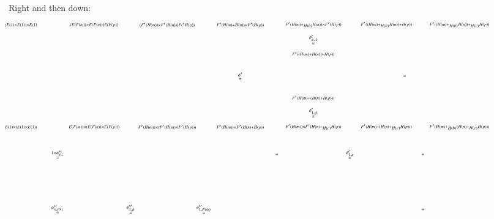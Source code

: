 \documentclass[reqno]{amsart}
\begin{document}
Right and then down:
\[
\hspace{-.8in}
\begin{tikzpicture}[scale=1.5]
\node (1) at (6,.4) {$\scriptscriptstyle{\stackrel{\phi'} \cong}$};
\node (2) at (8,1.4) {$\scriptscriptstyle{\stackrel{\phi'_{\psi,1}} \cong}$};
\node (3) at (8,-.6) {$\scriptscriptstyle{\stackrel{\phi'_{1,\psi}} \cong}$};
\node (4) at (10.5,.4) {$\scriptscriptstyle{\cong}$};
\node (5) at (1,-1.75) {$\scriptscriptstyle{\stackrel{1 \times \phi''_{y,z}} \cong}$};
\node (6) at (9,-1.75) {$\scriptscriptstyle{\stackrel{\phi'_{1,\kappa}} \cong}$};
\node (7) at (11,-1.75) {$\scriptscriptstyle{\cong}$};
\node (8) at (7,-1.75) {$\scriptscriptstyle{\cong}$};
\node (9) at (1,-3.25) {$\scriptscriptstyle{\stackrel{\phi''_{x,y \times z}} \cong}$};
\node (10) at (3,-3.25) {$\scriptscriptstyle{\stackrel{\phi''_{1,\phi}} \cong}$};
\node (11) at (5,-3.25) {$\scriptscriptstyle{\stackrel{\phi''_{1,F(\psi)}} \cong}$};
\node (12) at (11,-3.25) {$\scriptscriptstyle{\cong}$};

\node (A1) at (0,1.8) {$\scriptscriptstyle{(E(1) \times  E(1)) \times E(1)}$};
\node (A2) at (2,1.8) {$\scriptscriptstyle{(E(F(m)) \times E(F(n))) E(F(p))}$};
\node (A3) at (4,1.8) {$\scriptscriptstyle{(F'(H(m)) \times F'(H(n))) F('H(p))}$};
\node (A4) at (6,1.8) {$\scriptscriptstyle{F'(H(m) + H(n)) \times F'(H(p))}$};
\node (A5) at (8,1.8) {$\scriptscriptstyle{F'(H(m)+_{H(b)} H(n)) \times F'(H(p))}$};
\node (A6) at (10,1.8) {$\scriptscriptstyle{F'((H(m)+_{H(b)} H(n)) + H(p)) }$};
\node (A7) at (12,1.8) {$\scriptscriptstyle{F'((H(m)+_{H(b)} H(n))+_{H(c)} H(p))}$};

\node (A') at (8,1) {$\scriptscriptstyle{F'((H(m)+H(n))+H(p))}$};
\node (A'''') at (8,-0.2) {$\scriptscriptstyle{F'(H(m)+(H(n)+H(p)))}$};

\node (B1) at (0,-1) {$\scriptscriptstyle{E(1) \times (E(1) \times E(1))}$};
\node (B2) at (2,-1) {$\scriptscriptstyle{E(F(m)) \times (E(F(n)) \times E(F(p)))}$};
\node (B3) at (4,-1) {$\scriptscriptstyle{F'(H(m)) \times (F'(H(n)) \times F'(H(p)))}$};
\node (B4) at (6,-1) {$\scriptscriptstyle{F'(H(m)) \times F'(H(n)+H(p))}$};
\node (B5) at (8,-1) {$\scriptscriptstyle{F'(H(m)) \times F'(H(n)+_{H(c)} H(p))}$};
\node (B6) at (10,-1) {$\scriptscriptstyle{F'(H(m)+(H(n)+_{H(c)} H(p)))}$};
\node (B7) at (12,-1) {$\scriptscriptstyle{F'(H(m)+_{H(b)} (H(n)+_{H(c)} H(p)))}$};


\end{tikzpicture}\]
\end{document}
